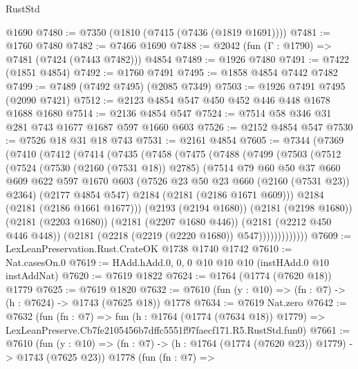 \begin{lexlean}{RustStd}
\begin{coremodule}
    @1690
@7480 := @7350 (@1810 (@7415 (@7436 (@1819 @1691))))
@7481 := @1760 @7480
@7482 := @7466 @1690
@7488 := @2042 (fun (Γ : @1790) => @7481 (@7424 (@7443 @7482))) @4854
@7489 := @1926 @7480
@7491 := @7422 (@1851 @4854)
@7492 := @1760 @7491
@7495 := @1858 @4854 @7442 @7482
@7499 := @7489 (@7492 @7495) (@2085 @7349)
@7503 := @1926 @7491 @7495 (@2090 @7421)
@7512 := @2123 @4854 @547 @450 @452 @446 @448 @1678 @1688 @1680
@7514 := @2136 @4854 @547
@7524 := @7514 @58 @346 @31 @281 @743 @1677 @1687 @597 @1660 @603
@7526 := @2152 @4854 @547
@7530 := @7526 @18 @31 @18 @743
@7531 := @2161 @4854
@7605 := @7344
    (@7369
      (@7410
        (@7412
          (@7414
            (@7435
              (@7458
                (@7475
                  (@7488
                    (@7499
                      (@7503
                        (@7512
                          (@7524
                            (@7530 (@2160 (@7531 @18)) @2785)
                            (@7514
                              @79
                              @60
                              @50
                              @37
                              @660
                              @609
                              @622
                              @597
                              @1670
                              @603
                              (@7526 @23 @50 @23 @660 (@2160 (@7531 @23)) @2364)
                              (@2177 @4854 @547)
                              @2184
                              (@2181 (@2186 @1671 @609)))
                            @2184
                            (@2181 (@2186 @1661 @1677)))
                          (@2193 (@2194 @1680))
                          (@2181 (@2198 @1680))
                          (@2181 (@2203 @1680))
                          (@2181 (@2207 @1680 @446))
                          (@2181 (@2212 @450 @446 @448))
                          (@2181 (@2218 (@2219 (@2220 @1680)) @547)))))))))))))
@7609 := LexLeanPreservation.Rust.CrateOK @1738 @1740 @1742
@7610 := Nat.casesOn.{0}
@7619 := HAdd.hAdd.{0, 0, 0} @10 @10 @10 (instHAdd.{0} @10 instAddNat)
@7620 := @7619 @1822
@7624 := @1764 (@1774 (@7620 @18)) @1779
@7625 := @7619 @1820
@7632 := @7610 (fun (y : @10) => (fn : @7) -> (h : @7624) -> @1743 (@7625 @18)) @1778
@7634 := @7619 Nat.zero
@7642 := @7632
    (fun (fn : @7) =>
    fun (h : @1764 (@1774 (@7634 @18)) @1779) =>
    LexLeanPreserve.Cb7fe2105456b7dffc5551f97faecf171.R5.RustStd.fun0)
@7661 := @7610
    (fun (y : @10) => (fn : @7) -> (h : @1764 (@1774 (@7620 @23)) @1779) -> @1743 (@7625 @23))
    @1778
    (fun (fn : @7) =>

\end{coremodule}
\end{lexlean}
